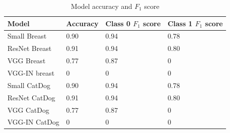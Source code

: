 \begin{table}[h]
\centering
\begin{tabular}{ |p{3cm}||p{3cm}|p{3cm}|p{3cm}|  }
 \hline
 Model       & Accuracy & Class 0 $F_1$ score & Class 1 $F_1$ score\\
 \hline
 \hline
 Small Breast   & 0.90  & 0.94 &  0.78\\
 ResNet Breast  & 0.91  & 0.94 &  0.80\\
 VGG Breast      & 0.77  & 0.87 &  0\\
 VGG-IN breast & 0 & 0 & 0 \\
 \hline
 Small CatDog   & 0.90  & 0.94 &  0.78\\
 ResNet CatDog  & 0.91  & 0.94 &  0.80\\
 VGG CatDog      & 0.77  & 0.87 &  0\\
 VGG-IN CatDog & 0 & 0 & 0 \\
  \hline
\end{tabular}
\caption{Model accuracy and $F_1$ score}
\label{acctable2}
\end{table}
